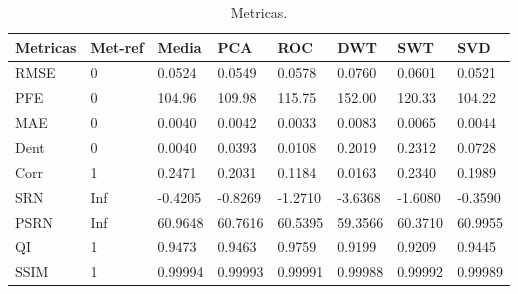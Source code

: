 \documentclass[conference]{IEEEtran}
\begin{document}
\begin{table}[hbt]
	\centering
	\tiny
	\caption{Metricas.}
	\label{cap_acf_tab01}
\begin{tabular}{@{}llllllll@{}} \toprule
	Metricas & Met-ref&  Media& PCA& ROC&DWT&SWT&SVD\\ \midrule
	RMSE & 0& 0.0524  &0.0549 &0.0578  &0.0760 &0.0601  & 0.0521\\
	PFE  & 0& 104.96  &109.98 & 115.75 &152.00 & 120.33 & 104.22\\
	MAE  & 0& 0.0040  &0.0042 & 0.0033 &0.0083 & 0.0065 & 0.0044\\
	Dent & 0& 0.0040  &0.0393 & 0.0108 &0.2019 & 0.2312 & 0.0728\\
	Corr & 1& 0.2471  &0.2031 & 0.1184 &0.0163 & 0.2340 & 0.1989\\
	SRN  & Inf&-0.4205  &-0.8269&-1.2710 &-3.6368&-1.6080 & -0.3590 \\
    PSRN & Inf& 60.9648 &60.7616& 60.5395&59.3566& 60.3710& 60.9955\\
	QI   & 1& 0.9473  &0.9463 &0.9759  &0.9199 & 0.9209 & 0.9445\\ 
    SSIM & 1& 0.99994 &0.99993& 0.99991&0.99988& 0.99992& 0.99989 \\\bottomrule
\end{tabular}
\end{table}
\end{document}

